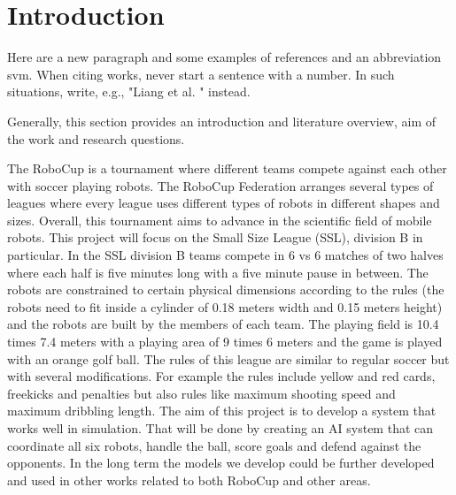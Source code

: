 \section{Introduction}
\label{section:intro}

Here are a new paragraph and some examples of references and an abbreviation \cite{IEEEtran, IEEEtranformatexample,webpage, FundConDep,exampleofjournalarticle,exampleofconferencepaper}
\ac{svm}. When citing works, never start a sentence with a number. In such situations, write, e.g., "Liang et al. \cite{exampleofconferencepaper}" instead.

Generally, this section provides an introduction and literature overview, aim of the work and research questions.

The RoboCup is a tournament where different teams compete against each other with soccer playing robots. The RoboCup Federation arranges several types of leagues where every league uses different types of robots in different shapes and sizes. Overall, this tournament aims to advance in the scientific field of mobile robots. 
This project will focus on the Small Size League (SSL), division B in particular. In the SSL division B teams compete in 6 vs 6 matches of two halves where each half is five minutes long with a five minute pause in between. The robots are constrained to certain physical dimensions according to the rules (the robots need to fit inside a cylinder of 0.18 meters width and 0.15 meters height) and the robots are built by the members of each team. The playing field is 10.4 times 7.4 meters with a playing area of 9 times 6 meters and the game is played with an orange golf ball. The rules of this league are similar to regular soccer but with several modifications. For example the rules include yellow and red cards, freekicks and penalties but also rules like maximum shooting speed and maximum dribbling length. 
The aim of this project is to develop a system that works well in simulation. That will be done by creating an AI system that can coordinate all six robots, handle the ball, score goals and defend against the opponents. In the long term the models we develop could be further developed and used in other works related to both RoboCup and other areas.
